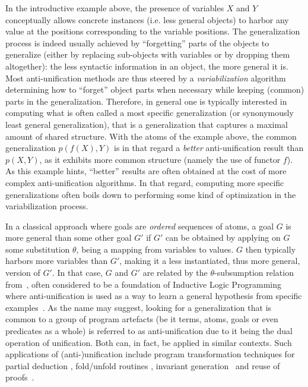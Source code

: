 In the introductive example above, the presence of variables $X$ and $Y$ conceptually allows concrete instances (i.e. less general objects) to harbor any value at the positions corresponding to the variable positions. The generalization process is indeed usually achieved by ``forgetting'' parts of the objects to generalize (either by replacing sub-objects with variables or by dropping them altogether): the less syntactic information in an object, the more general it is. Most anti-unification methods are thus steered by a \textit{variabilization} algorithm determining how to ``forget'' object parts when necessary while keeping (common) parts in the generalization. Therefore, in general one is typically interested in computing what is often called a most specific generalization (or synonymously least general generalization), that is a generalization that captures a maximal amount of shared structure. With the atoms of the example above, the common generalization $p(f(X), Y)$ is in that regard a \textit{better} anti-unification result than $p(X,Y)$, as it exhibits more common structure (namely the use of functor $f$). As this example hints, ``better'' results are often obtained at the cost of more complex anti-unification algorithms. In that regard, computing more specific generalizations often boils down to performing some kind of optimization in the variabilization process. 

In a classical approach where goals are \textit{ordered} sequences of atoms, a goal $G$ is more general than some other goal $G'$ if $G'$ can be obtained by applying on $G$ some substitution $\theta$, being a mapping from variables to values. $G$ then typically harbors more variables than $G'$, making it a less instantiated, thus more general, version of $G'$. In that case, $G$ and $G'$ are related by the $\theta$-subsumption relation from~\cite{plotkin}, often considered to be a foundation of Inductive Logic Programming where anti-unification is used as a way to learn a general hypothesis from specific examples~\cite{ilp-theory-and-methods}. As the name may suggest, looking for a generalization that is common to a group of program artefacts (be it terms, atoms, goals or even predicates as a whole) is referred to as anti-unification due to it being the dual operation of unification. Both can, in fact, be applied in similar contexts. Such applications of (anti-)unification include program transformation techniques for partial deduction \cite{Gallagher:1993:TSL:154630.154640,DESCHREYE1999231}, fold/unfold routines \cite{DBLP:journals/csur/PettorossiP98}, invariant generation~\cite{DBLP:conf/synasc/KovacsJ05} and reuse of proofs~\cite{unranked-2-order-au,calculus-constr}. 

